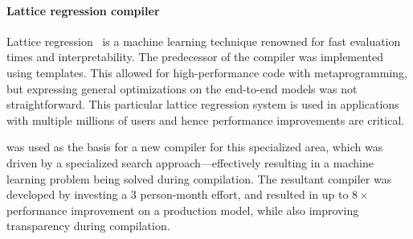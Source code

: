 
\paragraph{Lattice regression compiler}

Lattice regression~\cite{NIPS2009_3694} is a machine learning
technique renowned for fast evaluation times and interpretability.
The predecessor of the compiler was implemented using \Cpp
templates. This allowed for high-performance code with
metaprogramming, but expressing general optimizations on the
end-to-end models was not straightforward. This particular lattice
regression system is used in applications with multiple millions of
users and hence performance improvements are critical.

\MLIR was used as the basis for a new compiler for this specialized
area, which was driven by a specialized search approach---effectively
resulting in a machine learning problem being solved during
compilation. The resultant compiler was developed by investing a  3
person-month effort, and resulted in up to $8\times$ performance improvement
on a production model, while also improving transparency during
compilation.
